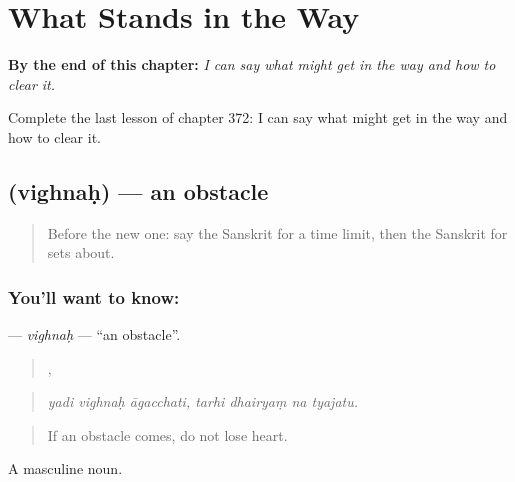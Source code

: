
\chapter{What Stands in the Way}
\label{ch:sa-what-stands-in-the-way}

\begin{chapteropening}
\textbf{By the end of this chapter:} \emph{I can say what might get in the way and how to clear it.}

Complete the last lesson of chapter 372: I can say what might get in the way and how to clear it.
\end{chapteropening}

\section[\texorpdfstring{\sk{विघ्नः} (vighnaḥ)}{विघ्नः (vighnaḥ)}]{ (vighnaḥ) — an obstacle}

\label{lesson:SA-C372-vighnah}



\begin{quote}
Before the new one: say the Sanskrit for a time limit, then the Sanskrit for sets about.
\end{quote}

\subsection*{You'll want to know: }
\textbf{} — \emph{vighnaḥ} — \textquotedblleft{}an obstacle\textquotedblright{}.

\begin{quote}
  ,    
\end{quote}

\begin{quote}
\emph{yadi vighnaḥ āgacchati, tarhi dhairyaṃ na tyajatu.}
\end{quote}

\begin{quote}
If an obstacle comes, do not lose heart.
\end{quote}

A masculine noun.


